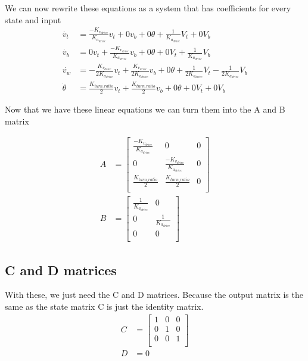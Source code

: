 \documentclass{scrartcl}
\begin{document}
We can now rewrite these equations as a system that has coefficients for every state and input
\begin{align}
    \dot{v_t}    & = \frac{-K_{v_\mathit{drive}}}{K_{a_\mathit{drive}}}v_t + 0v_b + 0\theta + \frac{1}{K_{a_\mathit{drive}}}V_t + 0V_b                                                                                  \\
    \dot{v_b}    & = 0v_t + \frac{-K_{v_\mathit{drive}}}{K_{a_\mathit{drive}}}v_b + 0\theta + 0V_t + \frac{1}{K_{a_\mathit{drive}}}V_b                                                                                  \\
    \dot{v_w}    & = -\frac{K_{v_\mathit{drive}}}{2K_{a_\mathit{drive}}}v_t + \frac{K_{v_\mathit{drive}}}{2K_{a_\mathit{drive}}}v_b + 0\theta + \frac{1}{2K_{a_\mathit{drive}}}V_t - \frac{1}{2K_{a_\mathit{drive}}}V_b \\
    \dot{\theta} & = \frac{K_\mathit{turn\_ratio}}{2}v_t + \frac{K_\mathit{turn\_ratio}}{2}v_b + 0\theta + 0V_t + 0V_b
\end{align}

Now that we have these linear equations we can turn them into the A and B matrix

\begin{align}
    A & =
    \begin{bmatrix}
        \frac{-K_{v_\mathit{drive}}}{K_{a_\mathit{drive}}} & 0                                                  & 0 \\
        0                                                  & \frac{-K_{v_\mathit{drive}}}{K_{a_\mathit{drive}}} & 0 \\
        \frac{K_\mathit{turn\_ratio}}{2}                   & \frac{K_\mathit{turn\_ratio}}{2}                   & 0 \\
    \end{bmatrix} \\
    B & =
    \begin{bmatrix}
        \frac{1}{K_{a_\mathit{drive}}} & 0                              \\
        0                              & \frac{1}{K_{a_\mathit{drive}}} \\
        0                              & 0                              \\
    \end{bmatrix}
\end{align}

\subsection{C and D matrices}
With these, we just need the C and D matrices.
Because the output matrix is the same as the state matrix C is just the identity matrix.
\begin{align}
    C & =
    \begin{bmatrix}
        1 & 0 & 0 \\
        0 & 1 & 0 \\
        0 & 0 & 1 \\
    \end{bmatrix} \\
    D & = 0
\end{align}
\end{document}
